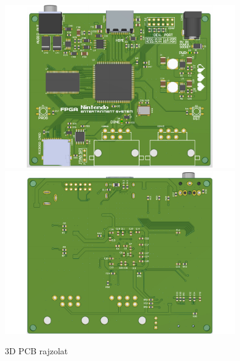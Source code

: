 	\begin{figure}[H]
		\centering
		\includegraphics[width=100mm, keepaspectratio, angle=90]{figures/Top}
		\includegraphics[width=100mm, keepaspectratio, angle=90]{figures/Bottom}
		\caption{3D PCB rajzolat} 
		\label{fig:PCB-3D}
	\end{figure}
	

	
	
	
	

